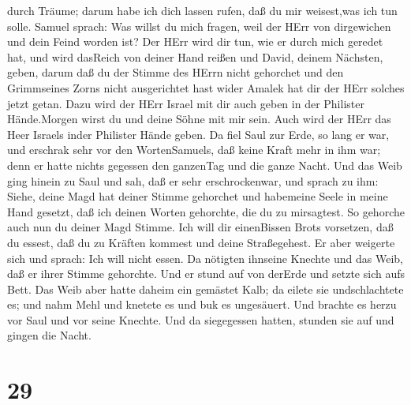 durch Träume; darum habe ich dich lassen rufen, daß du mir weisest,was
ich tun solle.  Samuel sprach: Was willst du mich fragen,
weil der HErr von dirgewichen und dein Feind worden ist? 
Der HErr wird dir tun, wie er durch mich geredet hat, und wird dasReich
von deiner Hand reißen und David, deinem Nächsten, geben, 
darum daß du der Stimme des HErrn nicht gehorchet und den Grimmseines
Zorns nicht ausgerichtet hast wider Amalek hat dir der HErr solches
jetzt getan.  Dazu wird der HErr Israel mit dir auch geben
in der Philister Hände.Morgen wirst du und deine Söhne mit mir sein.
Auch wird der HErr das Heer Israels inder Philister Hände geben.
 Da fiel Saul zur Erde, so lang er war, und erschrak sehr
vor den WortenSamuels, daß keine Kraft mehr in ihm war; denn er hatte
nichts gegessen den ganzenTag und die ganze Nacht.  Und das
Weib ging hinein zu Saul und sah, daß er sehr erschrockenwar, und sprach
zu ihm: Siehe, deine Magd hat deiner Stimme gehorchet und habemeine
Seele in meine Hand gesetzt, daß ich deinen Worten gehorchte, die du zu
mirsagtest.  So gehorche auch nun du deiner Magd Stimme.
Ich will dir einenBissen Brots vorsetzen, daß du essest, daß du zu
Kräften kommest und deine Straßegehest.  Er aber weigerte
sich und sprach: Ich will nicht essen. Da nötigten ihnseine Knechte und
das Weib, daß er ihrer Stimme gehorchte. Und er stund auf von derErde
und setzte sich aufs Bett.  Das Weib aber hatte daheim ein
gemästet Kalb; da eilete sie undschlachtete es; und nahm Mehl und
knetete es und buk es ungesäuert.  Und brachte es herzu vor
Saul und vor seine Knechte. Und da siegegessen hatten, stunden sie auf
und gingen die Nacht.

\hypertarget{section-28}{%
\section{29}\label{section-28}}

